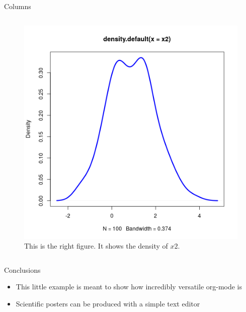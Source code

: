 \documentclass[final]{beamer}
\begin{document}
\begin{frame}[fragile,label={sec:org10a116a}]{}
\begin{columns}
\begin{column}[t]{0.45\columnwidth}
\begin{block}{Columns}
\begin{columns}
\begin{column}[T]{0.48\columnwidth}
\captionsetup{justification=justified,width=.85\linewidth}
\begin{figure}[htbp]
\centering
\includegraphics[width=.9\linewidth]{4r.png}
\caption{\label{fig:org96112b0}
This is the right figure. It shows the density of \(x2\).}
\end{figure}
\end{column}
\end{columns}
\end{block}

\begin{block}{Conclusions}
\begin{itemize}
\item This little example is meant to show how incredibly versatile
org-mode is
\item Scientific posters can be produced with a simple text editor
\end{itemize}
\end{block}
\end{column}
\end{columns}
\end{frame}
\end{document}
